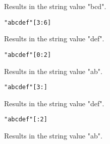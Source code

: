 {\begin{itemize}
{			Results in the string value "bcd".
		
		\item[] \lstinline[language=MAIA, columns=fixed]@"abcdef"[3:6]@
		
			Results in the string value "def".
		
		\item[] \lstinline[language=MAIA, columns=fixed]@"abcdef"[0:2]@
		
			Results in the string value "ab".
			
		\item[] \lstinline[language=MAIA, columns=fixed]@"abcdef"[3:]@
		
			Results in the string value "def".
		
		\item[] \lstinline[language=MAIA, columns=fixed]@"abcdef"[:2]@
		
			Results in the string value "ab".
	}
	\end{itemize}
}














